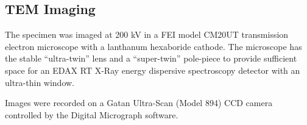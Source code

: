 \subsection{TEM Imaging}

The specimen was imaged at 200 kV in a FEI model CM20UT
transmission electron microscope with a lanthanum hexaboride
cathode. The microscope has the stable ``ultra-twin'' lens and
a ``super-twin'' pole-piece to provide sufficient space for an
EDAX RT X-Ray energy dispersive spectroscopy detector with an
ultra-thin window.

Images were recorded on a Gatan Ultra-Scan (Model 894) CCD
camera controlled by the Digital Micrograph software.

\endinput
